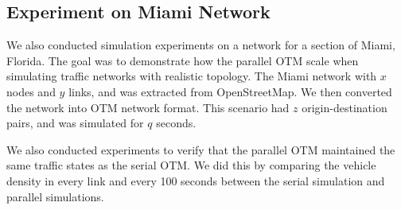 \subsection{Experiment on Miami Network}
We also conducted simulation experiments on a network for a section of Miami, Florida. The goal was to demonstrate how the parallel OTM scale when simulating traffic networks with realistic topology. The Miami network with $x$ nodes and $y$ links, and was extracted from OpenStreetMap\cite{haklay2008openstreetmap}. We then converted the network into OTM network format. This scenario had $z$ origin-destination pairs, and was simulated for $q$ seconds. 

We also conducted experiments to verify that the parallel OTM maintained the same traffic states as the serial OTM. We did this by comparing the vehicle density in every link and every 100 seconds between the serial simulation and parallel simulations. 

\vspace{1in}








 









